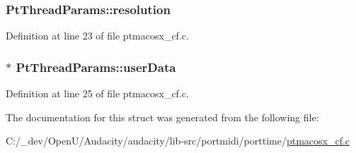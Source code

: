 \subsubsection[{\texorpdfstring{resolution}{resolution}}]{ Pt\+Thread\+Params\+::resolution}\hypertarget{struct_pt_thread_params_a774e27a8650e056ea0897bbdd9d7cc90}{}\label{struct_pt_thread_params_a774e27a8650e056ea0897bbdd9d7cc90}


Definition at line 23 of file ptmacosx\+\_\+cf.\+c.

\subsubsection[{\texorpdfstring{user\+Data}{userData}}]{$\ast$ Pt\+Thread\+Params\+::user\+Data}\hypertarget{struct_pt_thread_params_ae3b2a829f0795f047aa19940a25f49e5}{}\label{struct_pt_thread_params_ae3b2a829f0795f047aa19940a25f49e5}


Definition at line 25 of file ptmacosx\+\_\+cf.\+c.



The documentation for this struct was generated from the following file\+:\begin{DoxyCompactItemize}
\item 
C\+:/\+\_\+dev/\+Open\+U/\+Audacity/audacity/lib-\/src/portmidi/porttime/\hyperlink{ptmacosx__cf_8c}{ptmacosx\+\_\+cf.\+c}\end{DoxyCompactItemize}

